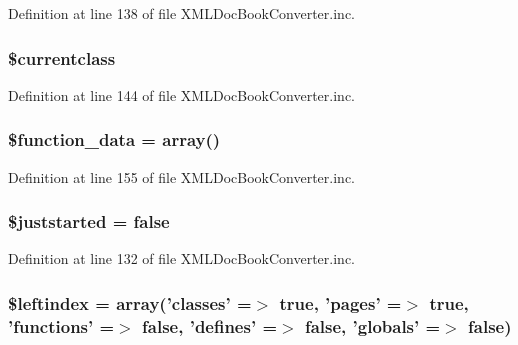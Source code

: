 \-Definition at line 138 of file \-X\-M\-L\-Doc\-Book\-Converter.\-inc.

\hypertarget{class_x_m_l_doc_book_converter_a14f3ccc5fc24cdb94ee022a77ef69c4d}{
\subsubsection[{\$currentclass}]{\setlength{\rightskip}{0pt plus 5cm}\$currentclass}}\label{class_x_m_l_doc_book_converter_a14f3ccc5fc24cdb94ee022a77ef69c4d}


\-Definition at line 144 of file \-X\-M\-L\-Doc\-Book\-Converter.\-inc.

\hypertarget{class_x_m_l_doc_book_converter_abbfa657ff6e0d3c42caa2576e218ebea}{
\subsubsection[{\$function\-\_\-data}]{\setlength{\rightskip}{0pt plus 5cm}\$function\-\_\-data = array()}}\label{class_x_m_l_doc_book_converter_abbfa657ff6e0d3c42caa2576e218ebea}


\-Definition at line 155 of file \-X\-M\-L\-Doc\-Book\-Converter.\-inc.

\hypertarget{class_x_m_l_doc_book_converter_acb00e2d25525278b0592bfffe53bc4b6}{
\subsubsection[{\$juststarted}]{\setlength{\rightskip}{0pt plus 5cm}\$juststarted = false}}\label{class_x_m_l_doc_book_converter_acb00e2d25525278b0592bfffe53bc4b6}


\-Definition at line 132 of file \-X\-M\-L\-Doc\-Book\-Converter.\-inc.

\hypertarget{class_x_m_l_doc_book_converter_ab49669c749559bb7833762878adb8f0c}{
\subsubsection[{\$leftindex}]{\setlength{\rightskip}{0pt plus 5cm}\$leftindex = array('classes' =$>$ true, 'pages' =$>$ true, 'functions' =$>$ false, 'defines' =$>$ false, 'globals' =$>$ false)}}\label{class_x_m_l_doc_book_converter_ab49669c749559bb7833762878adb8f0c}


